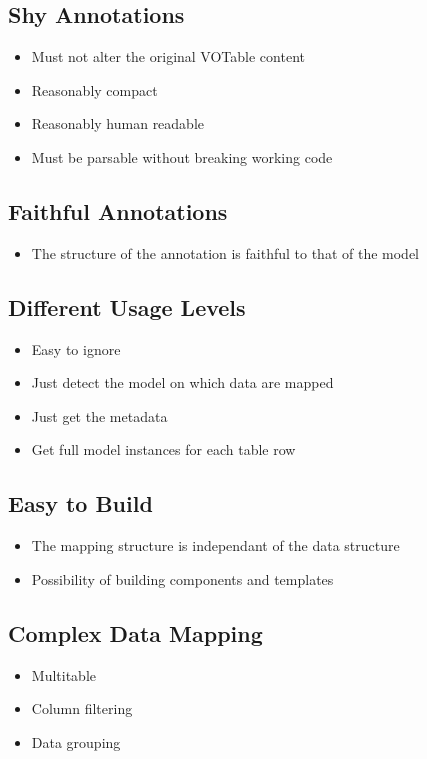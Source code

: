 \documentclass[11pt,a4paper]{ivoa}
\begin{document}
\subsection{Shy Annotations}
\begin{itemize}
   \item Must not alter the original VOTable content
   \item Reasonably compact
   \item Reasonably human readable
   \item Must be parsable without breaking working code
\end{itemize}

\subsection{Faithful Annotations}
\begin{itemize}
   \item The structure of the annotation is faithful to that of the model 
\end{itemize}

\subsection{Different Usage Levels}
\begin{itemize}
   \item Easy to ignore
   \item Just detect the model on which data are mapped
   \item Just get the metadata
   \item Get full model instances for each table row
\end{itemize}

\subsection{Easy to Build}
\begin{itemize}
   \item The mapping structure is independant of the data structure
   \item Possibility of building components and templates
\end{itemize}

\subsection{Complex Data Mapping}
\begin{itemize}
   \item Multitable
   \item Column filtering
   \item Data grouping
\end{itemize}
\end{document}
